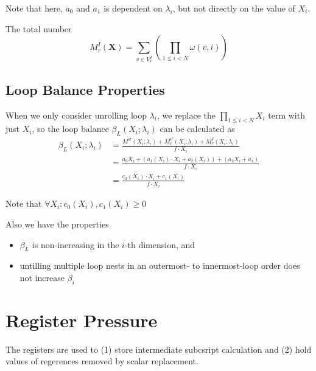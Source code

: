 Note that here, $a_{0}$ and $a_{1}$ is dependent on $\lambda_{i}$, but not
directly on the value of $X_{i}$.

The total number 
\begin{equation}
  M^{I}_{r}(\mathbf{X}) = \sum_{v \in V^{I}_{r}} \left(
    \prod_{1 \le i < N} \omega(v, i)
\right)
\end{equation}

%

\subsection{Loop Balance Properties}
When we only consider unrolling loop $\lambda_{i}$, we replace the $\prod_{1 \le i
< N} X_{i}$ term with just $X_{i}$, so the loop balance $\beta_{L}(X_{i}; \lambda_{i})$
can be calculated as
\begin{equation}
  \begin{aligned}
    \beta_{L}(X_{i}; \lambda_{i})
    &= \frac{M^{\varnothing}(X_i;\lambda_{i}) + M^{C}_{r}(X_i;\lambda_{i}) +
      M^{I}_{r}(X_i;\lambda_{i})}{f \cdot X_{i}} \\
    &= \frac{
      a_{0} X_{i} + (a_{1}(X_{i}) \cdot X_{i} + a_{2}(X_{i})) +
      (a_{3} X_{i} + a_{4})
    }{f \cdot X_{i}} \\
    &= \frac{c_{0}(X_{i}) \cdot X_{i} + c_{1}(X_{i})}{f \cdot X_{i}}
  \end{aligned}
\end{equation}

Note that $\forall X_{i}: c_{0}(X_{i}), c_{1}(X_{i}) \ge 0$

Also we have the properties
\begin{itemize}[nosep]
  \item $\beta_{L}$ is non-increasing in the $i$-th dimension, and
  \item untilling multiple loop nests in an outermost- to innermost-loop
    order does not increase $\beta_{i}$
\end{itemize}

\section{Register Pressure}
The registers are used to (1) store intermediate subcsript calculation and (2)
hold values of regerences removed by scalar replacement.


